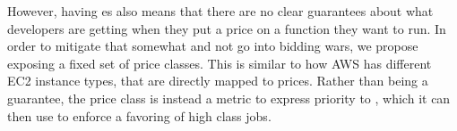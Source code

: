 However, having \priceclass{}es also means that there are no clear guarantees
about what developers are getting when they put a price on a function they want
to run. In order to mitigate that somewhat and not go into bidding wars, we
propose exposing a fixed set of price classes. This is similar to how AWS has
different EC2 instance types, that are directly mapped to prices. Rather than
being a guarantee, the price class is instead a metric to express priority to
\sys{}, which it can then use to enforce a favoring of high class jobs.

